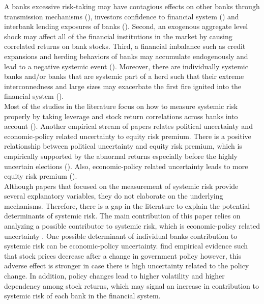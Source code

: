 \documentclass[11pt, oneside]{article}   	%
\begin{document}
A bank\textsc{}s excessive risk-taking may have contagious effects on other banks through transmission mechanisms (\cite{hartmannvries2006}), investors\textsc{} confidence to financial system (\cite{calomiris1997}) and interbank lending exposures of banks (\cite{iyer2011}). Second, an exogenous aggregate level shock may affect all of the financial institutions in the market by causing correlated returns on bank stocks. Third, a financial imbalance such as credit expansions and herding behaviors of banks may accumulate endogenously and lead to a negative systemic event (\cite{debandt2015}). Moreover, there are \textsc{}individually systemic\textsc{} banks and/or banks that are \textsc{}systemic part of a herd\textsc{} such that their extreme interconnedness and large sizes may exacerbate the first fire ignited into the financial system (\cite{brunnermeier2009}). \\
Most of the studies in the literature focus on how to measure systemic risk properly by taking leverage and stock return correlations across banks into account (\cite{acharya2012,acharya2017,brunnermeier2009,brownleesengle2015}). Another empirical stream of papers relates political uncertainty and economic-policy related uncertainty to equity risk premium. There is a positive relationship between political uncertainty and equity risk premium, which is empirically supported by the abnormal returns especially before the highly uncertain elections (\cite{li2006}). Also, economic-policy related uncertainty leads to more equity risk premium (\cite{pastorveronesi2012}). \\
Although papers that focused on the measurement of systemic risk provide several explanatory variables, they do not elaborate on the underlying mechanisms. Therefore, there is a gap in the literature to explain the potential determinants of systemic risk. The main contribution of this paper relies on analyzing a possible contributor to systemic risk, which is economic-policy related uncertainty . One possible determinant of individual bank\textsc{}s contribution to systemic risk can be economic-policy uncertainty. \cite{pastorveronesi2012} find empirical evidence such that stock prices decrease after a change in government policy however, this adverse effect is stronger in case there is high uncertainty related to the policy change. In addition, policy changes lead to higher volatility and higher dependency among stock returns, which may signal an increase in contribution to systemic risk of each bank in the financial system. \\
\end{document}
